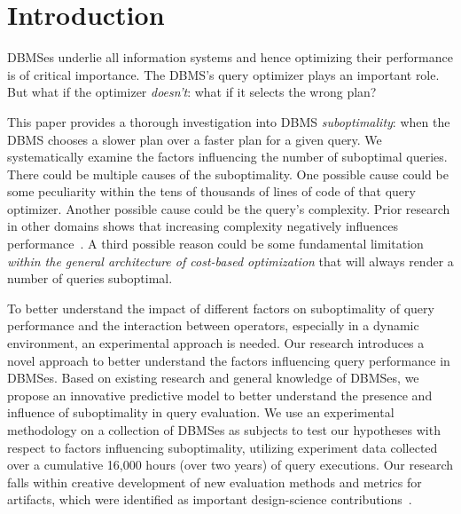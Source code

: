 \documentclass[prodmode,acmtods]{acmsmall}
\begin{document}
\section{Introduction}\label{sec:intro}
DBMSes underlie all information systems and hence optimizing their performance is of
critical importance. The DBMS's query optimizer plays an important role. But
what if the optimizer {\em doesn't}: what if it selects the wrong plan?

This paper provides a thorough investigation into \hbox{DBMS} {\em
  suboptimality}: when the \hbox{DBMS} chooses a slower plan over a faster
plan for a given query. We systematically examine the factors influencing
the number of suboptimal queries. There could be multiple causes of the
suboptimality. One possible cause could be some peculiarity within the tens
of thousands of lines of code of that query optimizer. Another possible
cause could be the query's complexity. Prior research in other domains shows
that increasing complexity negatively influences
performance~\cite{campbell88,moody98}. A third possible reason could be some
fundamental limitation {\em within the general architecture of cost-based
  optimization} that will always render a number of queries suboptimal.

To better understand the impact of different factors on suboptimality of
query performance and the interaction between operators, especially in a
dynamic environment, an experimental approach is needed.
Our research introduces a novel approach
to better understand the factors influencing query performance in
\hbox{DBMSes}. Based on existing research and general knowledge of \hbox{DBMSes}, we
propose an innovative predictive model to better understand the presence and influence
of suboptimality in query evaluation. We use an experimental methodology on
a collection of \hbox{DBMSes} as subjects to test our hypotheses with respect to factors
influencing suboptimality, utilizing
experiment data collected over a \hbox{cumulative} 16,000 hours (over two
years) of query executions.
Our research falls within creative development of
new evaluation methods and metrics for artifacts, which were identified as
important design-science contributions~\cite{hevner04}.
\end{document}
